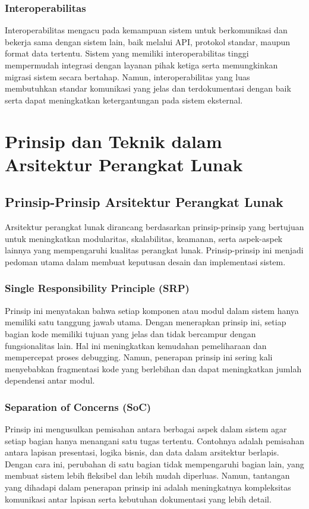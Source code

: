\subsubsection{Interoperabilitas}
Interoperabilitas mengacu pada kemampuan sistem untuk berkomunikasi dan bekerja sama dengan sistem lain, baik melalui API, protokol standar, maupun format data tertentu. Sistem yang memiliki interoperabilitas tinggi mempermudah integrasi dengan layanan pihak ketiga serta memungkinkan migrasi sistem secara bertahap. Namun, interoperabilitas yang luas membutuhkan standar komunikasi yang jelas dan terdokumentasi dengan baik serta dapat meningkatkan ketergantungan pada sistem eksternal.


\section{Prinsip dan Teknik dalam Arsitektur Perangkat Lunak}

\subsection{Prinsip-Prinsip Arsitektur Perangkat Lunak}

Arsitektur perangkat lunak dirancang berdasarkan prinsip-prinsip yang bertujuan untuk meningkatkan modularitas, skalabilitas, keamanan, serta aspek-aspek lainnya yang mempengaruhi kualitas perangkat lunak. Prinsip-prinsip ini menjadi pedoman utama dalam membuat keputusan desain dan implementasi sistem.

\subsubsection{Single Responsibility Principle (SRP)}
Prinsip ini menyatakan bahwa setiap komponen atau modul dalam sistem hanya memiliki satu tanggung jawab utama. Dengan menerapkan prinsip ini, setiap bagian kode memiliki tujuan yang jelas dan tidak bercampur dengan fungsionalitas lain. Hal ini meningkatkan kemudahan pemeliharaan dan mempercepat proses debugging. Namun, penerapan prinsip ini sering kali menyebabkan fragmentasi kode yang berlebihan dan dapat meningkatkan jumlah dependensi antar modul.

\subsubsection{Separation of Concerns (SoC)}
Prinsip ini mengusulkan pemisahan antara berbagai aspek dalam sistem agar setiap bagian hanya menangani satu tugas tertentu. Contohnya adalah pemisahan antara lapisan presentasi, logika bisnis, dan data dalam arsitektur berlapis. Dengan cara ini, perubahan di satu bagian tidak mempengaruhi bagian lain, yang membuat sistem lebih fleksibel dan lebih mudah diperluas. Namun, tantangan yang dihadapi dalam penerapan prinsip ini adalah meningkatnya kompleksitas komunikasi antar lapisan serta kebutuhan dokumentasi yang lebih detail.


